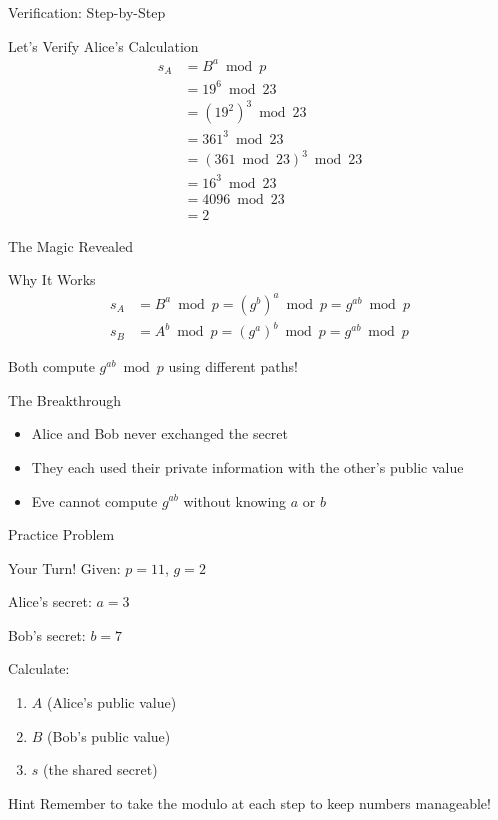 \documentclass{beamer}
\begin{document}
\begin{frame}{Verification: Step-by-Step}
\begin{block}{Let's Verify Alice's Calculation}
\begin{align*}
s_A &= B^a \bmod p \\
    &= 19^6 \bmod 23 \\
    &= (19^2)^3 \bmod 23 \\
    &= 361^3 \bmod 23 \\
    &= (361 \bmod 23)^3 \bmod 23 \\
    &= 16^3 \bmod 23 \\
    &= 4096 \bmod 23 \\
    &= 2
\end{align*}
\end{block}
\end{frame}

\begin{frame}{The Magic Revealed}
\begin{block}{Why It Works}
\begin{align*}
s_A &= B^a \bmod p = (g^b)^a \bmod p = g^{ab} \bmod p \\
s_B &= A^b \bmod p = (g^a)^b \bmod p = g^{ab} \bmod p
\end{align*}

Both compute $g^{ab} \bmod p$ using different paths!
\end{block}

\pause

\begin{exampleblock}{The Breakthrough}
\begin{itemize}
    \item Alice and Bob never exchanged the secret
    \item They each used their private information with the other's public value
    \item Eve cannot compute $g^{ab}$ without knowing $a$ or $b$
\end{itemize}
\end{exampleblock}
\end{frame}

\begin{frame}{Practice Problem}
\begin{block}{Your Turn!}
Given: $p = 11$, $g = 2$

Alice's secret: $a = 3$

Bob's secret: $b = 7$

\vspace{0.5cm}

Calculate:
\begin{enumerate}
    \item $A$ (Alice's public value)
    \item $B$ (Bob's public value)
    \item $s$ (the shared secret)
\end{enumerate}
\end{block}

\pause

\begin{alertblock}{Hint}
Remember to take the modulo at each step to keep numbers manageable!
\end{alertblock}
\end{frame}
\end{document}
